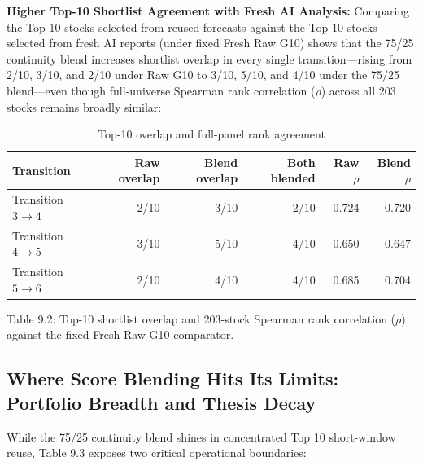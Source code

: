 \documentclass[11pt,a4paper]{article}
\numberwithin{table}{section}
\begin{document}
\textbf{Higher Top-10 Shortlist Agreement with Fresh AI Analysis:} Comparing the Top 10 stocks selected from reused forecasts against the Top 10 stocks selected from fresh AI reports (under fixed Fresh Raw G10) shows that the 75/25 continuity blend increases shortlist overlap in every single transition---rising from 2/10, 3/10, and 2/10 under Raw G10 to 3/10, 5/10, and 4/10 under the 75/25 blend---even though full-universe Spearman rank correlation ($\rho$) across all 203 stocks remains broadly similar:

\begin{minipage}{\linewidth}
\begin{center}\small\setlength{\tabcolsep}{3pt}\renewcommand{\arraystretch}{1.18}
\begin{longtable}{@{}lrrrrr@{}}
\caption{Top-10 overlap and full-panel rank agreement}\\
\toprule
Transition & Raw overlap & Blend overlap & Both blended & Raw $\rho$ & Blend $\rho$\\\midrule\endhead
Transition $3\to 4$ & 2/10 & 3/10 & 2/10 & 0.724 & 0.720\\
Transition $4\to 5$ & 3/10 & 5/10 & 4/10 & 0.650 & 0.647\\
Transition $5\to 6$ & 2/10 & 4/10 & 4/10 & 0.685 & 0.704\\
\bottomrule\end{longtable}\end{center}
\end{minipage}\par
Table 9.2: Top-10 shortlist overlap and 203-stock Spearman rank correlation ($\rho$) against the fixed Fresh Raw G10 comparator.

\subsection{Where Score Blending Hits Its Limits: Portfolio Breadth and Thesis Decay}

While the 75/25 continuity blend shines in concentrated Top 10 short-window reuse, Table 9.3 exposes two critical operational boundaries:
\end{document}
